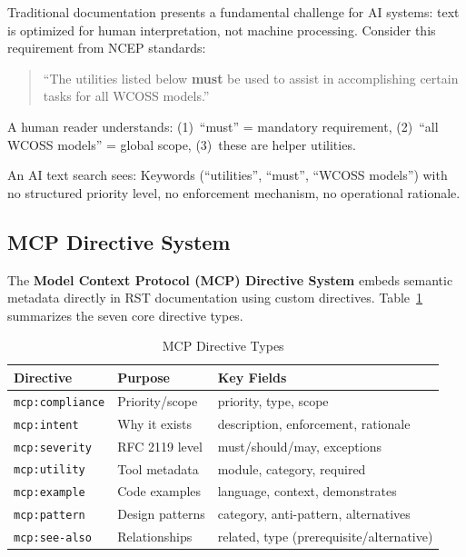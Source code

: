 \documentclass[11pt,letterpaper]{article}
\begin{document}
Traditional documentation presents a fundamental challenge for AI systems: text is optimized for human interpretation, not machine processing. Consider this requirement from NCEP standards:

\begin{quote}
``The utilities listed below \textbf{must} be used to assist in accomplishing certain tasks for all WCOSS models.''
\end{quote}

A human reader understands: (1)~``must'' = mandatory requirement, (2)~``all WCOSS models'' = global scope, (3)~these are helper utilities.

An AI text search sees: Keywords (``utilities'', ``must'', ``WCOSS models'') with no structured priority level, no enforcement mechanism, no operational rationale.

\subsection{MCP Directive System}

The \textbf{Model Context Protocol (MCP) Directive System} embeds semantic metadata directly in RST documentation using custom directives. Table~\ref{tab:directives} summarizes the seven core directive types.

\begin{table}[h]
\centering
\caption{MCP Directive Types}
\label{tab:directives}
\begin{tabular}{@{}lll@{}}
\toprule
\textbf{Directive} & \textbf{Purpose} & \textbf{Key Fields} \\
\midrule
\texttt{mcp:compliance} & Priority/scope & priority, type, scope \\
\texttt{mcp:intent} & Why it exists & description, enforcement, rationale \\
\texttt{mcp:severity} & RFC 2119 level & must/should/may, exceptions \\
\texttt{mcp:utility} & Tool metadata & module, category, required \\
\texttt{mcp:example} & Code examples & language, context, demonstrates \\
\texttt{mcp:pattern} & Design patterns & category, anti-pattern, alternatives \\
\texttt{mcp:see-also} & Relationships & related, type (prerequisite/alternative) \\
\bottomrule
\end{tabular}
\end{table}
\end{document}
